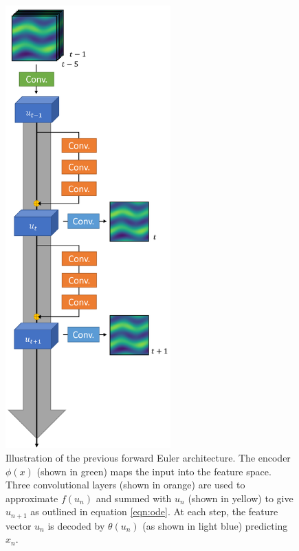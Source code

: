 \documentclass[12pt]{article}
\theoremstyle{plain}
\theoremstyle{remark}
\theoremstyle{definition}
\begin{document}
\begin{figure}
	\begin{minipage}[c]{0.49\textwidth}
		\centering
		\includegraphics[width=2.5in]{pde_arch}
		\caption{Illustration of the previous forward Euler architecture. The encoder $\phi(x)$ (shown in green) maps the input into the feature space. Three convolutional layers (shown in orange) are used to approximate $f(u_n)$ and summed with $u_n$ (shown in yellow) to give $u_{n+1}$ as outlined in equation \ref{eqn:ode}. At each step, the feature vector $u_n$ is decoded by $\theta(u_n)$ (as shown in light blue) predicting $x_n$.}
		\label{fig:arch}


\end{minipage}
\end{figure}
\end{document}
